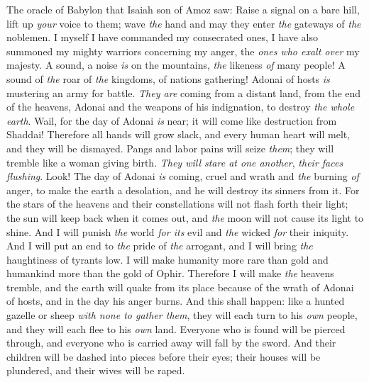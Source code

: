 \begin{biblechapter} %
 The oracle of Babylon that Isaiah son of Amoz saw:
\verse Raise a signal on a bare hill, 
lift up \textit{your} voice to them; 
wave \textit{the} hand and may they enter \textit{the} gateways of \textit{the} noblemen.
\verse I myself I have commanded my consecrated ones, 
I have also summoned my mighty warriors concerning my anger, 
the \textit{ones who exalt over} my majesty.
\verse A sound, a noise \textit{is} on the mountains, 
\textit{the} likeness \textit{of} many people! 
A sound of \textit{the} roar of \textit{the} kingdoms, 
of nations gathering! 
Adonai of hosts \textit{is} mustering an army for battle.
\verse \textit{They are} coming from a distant land, 
from the end of the heavens, 
Adonai and the weapons of his indignation, 
to destroy \textit{the whole earth}.
\verse Wail, for the day of Adonai \textit{is} near; 
it will come like destruction from Shaddai!
\verse Therefore all hands will grow slack, 
and every human heart will melt,
\verse and they will be dismayed. 
Pangs and labor pains will seize \textit{them}; 
they will tremble like a woman giving birth. 
\textit{They will stare at one another}, 
\textit{their faces flushing}.
\verse Look! The day of Adonai \textit{is} coming, 
cruel and wrath and \textit{the} burning \textit{of} anger, 
to make the earth a desolation, 
and he will destroy its sinners from it.
\verse For the stars of the heavens and their constellations will not flash forth their light; 
the sun will keep back when it comes out, 
and \textit{the} moon will not cause its light to shine.
\verse And I will punish \textit{the} world \textit{for its} evil 
and \textit{the} wicked \textit{for} their iniquity. 
And I will put an end to \textit{the} pride of \textit{the} arrogant, 
and I will bring \textit{the} haughtiness of tyrants low.
\verse I will make humanity more rare than gold 
and humankind more than the gold of Ophir.
\verse Therefore I will make \textit{the} heavens tremble, 
and the earth will quake from its place 
because of the wrath of Adonai of hosts, 
and in the day his anger burns.
\verse And this shall happen:
\verse like a hunted gazelle or sheep \textit{with none to gather them}, 
they will each turn to his \textit{own} people, 
and they will each flee to his \textit{own} land.
\verse Everyone who is found will be pierced through, 
and everyone who is carried away will fall by the sword.
\verse And their children will be dashed into pieces before their eyes; 
their houses will be plundered, and their wives will be raped.

\end{biblechapter}
